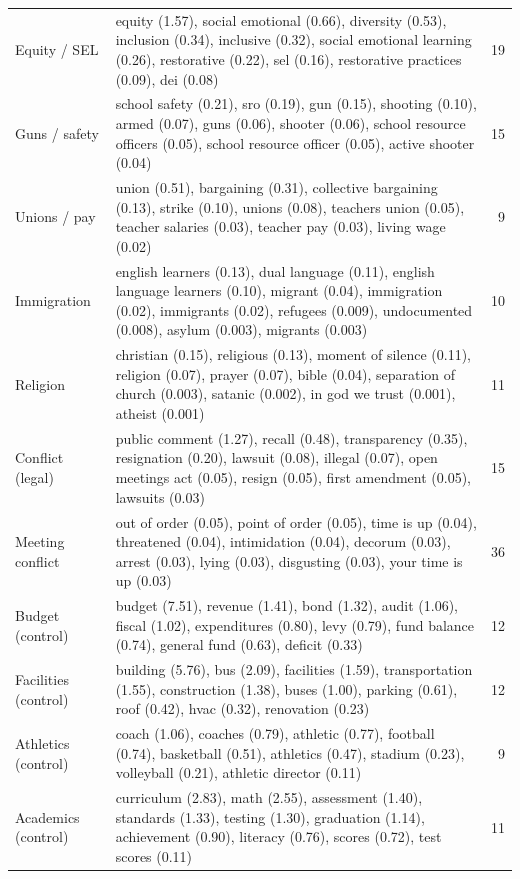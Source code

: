 \begin{landscape}
\begin{longtable}{@{}p{3.3cm}p{17.2cm}r@{}}
Equity / SEL & equity (1.57), social emotional (0.66), diversity (0.53), inclusion (0.34), inclusive (0.32), social emotional learning (0.26), restorative (0.22), sel (0.16), restorative practices (0.09), dei (0.08) & 19 \\[3pt]
Guns / safety & school safety (0.21), sro (0.19), gun (0.15), shooting (0.10), armed (0.07), guns (0.06), shooter (0.06), school resource officers (0.05), school resource officer (0.05), active shooter (0.04) & 15 \\[3pt]
Unions / pay & union (0.51), bargaining (0.31), collective bargaining (0.13), strike (0.10), unions (0.08), teachers union (0.05), teacher salaries (0.03), teacher pay (0.03), living wage (0.02) & 9 \\[3pt]
Immigration & english learners (0.13), dual language (0.11), english language learners (0.10), migrant (0.04), immigration (0.02), immigrants (0.02), refugees (0.009), undocumented (0.008), asylum (0.003), migrants (0.003) & 10 \\[3pt]
Religion & christian (0.15), religious (0.13), moment of silence (0.11), religion (0.07), prayer (0.07), bible (0.04), separation of church (0.003), satanic (0.002), in god we trust (0.001), atheist (0.001) & 11 \\[3pt]
Conflict (legal) & public comment (1.27), recall (0.48), transparency (0.35), resignation (0.20), lawsuit (0.08), illegal (0.07), open meetings act (0.05), resign (0.05), first amendment (0.05), lawsuits (0.03) & 15 \\[3pt]
Meeting conflict & out of order (0.05), point of order (0.05), time is up (0.04), threatened (0.04), intimidation (0.04), decorum (0.03), arrest (0.03), lying (0.03), disgusting (0.03), your time is up (0.03) & 36 \\[3pt]
Budget (control) & budget (7.51), revenue (1.41), bond (1.32), audit (1.06), fiscal (1.02), expenditures (0.80), levy (0.79), fund balance (0.74), general fund (0.63), deficit (0.33) & 12 \\[3pt]
Facilities (control) & building (5.76), bus (2.09), facilities (1.59), transportation (1.55), construction (1.38), buses (1.00), parking (0.61), roof (0.42), hvac (0.32), renovation (0.23) & 12 \\[3pt]
Athletics (control) & coach (1.06), coaches (0.79), athletic (0.77), football (0.74), basketball (0.51), athletics (0.47), stadium (0.23), volleyball (0.21), athletic director (0.11) & 9 \\[3pt]
Academics (control) & curriculum (2.83), math (2.55), assessment (1.40), standards (1.33), testing (1.30), graduation (1.14), achievement (0.90), literacy (0.76), scores (0.72), test scores (0.11) & 11 \\[3pt]
\end{longtable}
\end{landscape}
